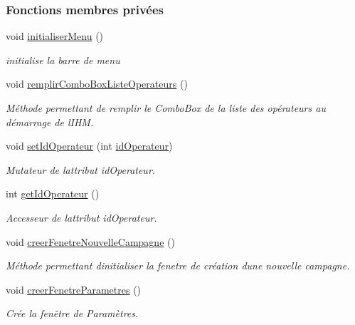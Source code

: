 \subsubsection*{Fonctions membres privées}
\begin{DoxyCompactItemize}
\item 
void \hyperlink{class_i_h_m_rov_aebbcb2325c2d1a88a012d8408e2d6223}{initialiser\+Menu} ()
\begin{DoxyCompactList}\small\item\em initialise la barre de menu \end{DoxyCompactList}\item 
void \hyperlink{class_i_h_m_rov_a752a8dc2b3b68d536e94ff8bfb62f46f}{remplir\+Combo\+Box\+Liste\+Operateurs} ()
\begin{DoxyCompactList}\small\item\em Méthode permettant de remplir le Combo\+Box de la liste des opérateurs au démarrage de l\textquotesingle{}I\+HM. \end{DoxyCompactList}\item 
void \hyperlink{class_i_h_m_rov_a021be212b27d0c4a08e14695521aacbc}{set\+Id\+Operateur} (int \hyperlink{class_i_h_m_rov_a110af5c174e9fbba12bffbe0301ed690}{id\+Operateur})
\begin{DoxyCompactList}\small\item\em Mutateur de l\textquotesingle{}attribut id\+Operateur. \end{DoxyCompactList}\item 
int \hyperlink{class_i_h_m_rov_a79cddc1e905195eb11a8960abadf7d2f}{get\+Id\+Operateur} ()
\begin{DoxyCompactList}\small\item\em Accesseur de l\textquotesingle{}attribut id\+Operateur. \end{DoxyCompactList}\item 
void \hyperlink{class_i_h_m_rov_a08bf623a890df272f738c1ff8631213f}{creer\+Fenetre\+Nouvelle\+Campagne} ()
\begin{DoxyCompactList}\small\item\em Méthode permettant d\textquotesingle{}initialiser la fenetre de création d\textquotesingle{}une nouvelle campagne. \end{DoxyCompactList}\item 
void \hyperlink{class_i_h_m_rov_aed451139ac09ef18b7c92637761d80ce}{creer\+Fenetre\+Parametres} ()
\begin{DoxyCompactList}\small\item\em Crée la fenêtre de Paramètres. \end{DoxyCompactList}\item 

\end{DoxyCompactItemize}
